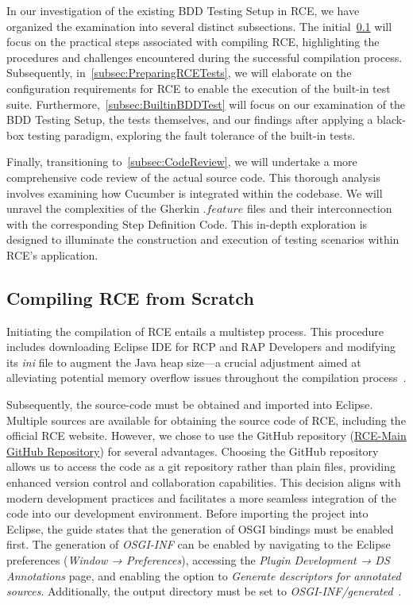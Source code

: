 In our investigation of the existing BDD Testing Setup in \ac{RCE}, we have organized the examination into several distinct subsections. The initial~\cref{subsec:BuildingRCE} will focus on the practical steps associated with compiling \ac{RCE}, highlighting the procedures and challenges encountered during the successful compilation process. Subsequently, in~\cref{subsec:PreparingRCETests}, we will elaborate on the configuration requirements for \ac{RCE} to enable the execution of the built-in test suite. Furthermore,~\cref{subsec:BuiltinBDDTest} will focus on our examination of the BDD Testing Setup, the tests themselves, and our findings after applying a black-box testing paradigm, exploring the fault tolerance of the built-in tests.

Finally, transitioning to~\cref{subsec:CodeReview}, we will undertake a more comprehensive code review of the actual source code. This thorough analysis involves examining how Cucumber is integrated within the codebase. We will unravel the complexities of the Gherkin $.feature$ files and their interconnection with the corresponding Step Definition Code. This in-depth exploration is designed to illuminate the construction and execution of testing scenarios within \ac{RCE}'s application.

\subsection{Compiling \ac{RCE} from Scratch}
\label{subsec:BuildingRCE}
Initiating the compilation of \ac{RCE} entails a multistep process. This procedure includes downloading Eclipse IDE for RCP and RAP Developers and modifying its \textit{ini} file to augment the Java heap size—a crucial adjustment aimed at alleviating potential memory overflow issues throughout the compilation process~\cite{rceDevGuide10x}.

Subsequently, the source-code must be obtained and imported into Eclipse. Multiple sources are available for obtaining the source code of \ac{RCE}, including the official RCE website. However, we chose to use the GitHub repository (\href{https://github.com/rcenvironment/rce-main}{RCE-Main GitHub Repository}) for several advantages. Choosing the GitHub repository allows us to access the code as a git repository rather than plain files, providing enhanced version control and collaboration capabilities. This decision aligns with modern development practices and facilitates a more seamless integration of the code into our development environment. Before importing the project into Eclipse, the guide states that the generation of OSGI bindings must be enabled first. The generation of \textit{OSGI-INF} can be enabled by navigating to the Eclipse preferences (\textit{Window → Preferences}), accessing the \textit{Plugin Development → DS Annotations} page, and enabling the option to \textit{Generate descriptors for annotated sources}. Additionally, the output directory must be set to \textit{OSGI-INF/generated}~\cite{rceDevGuide10x}.

